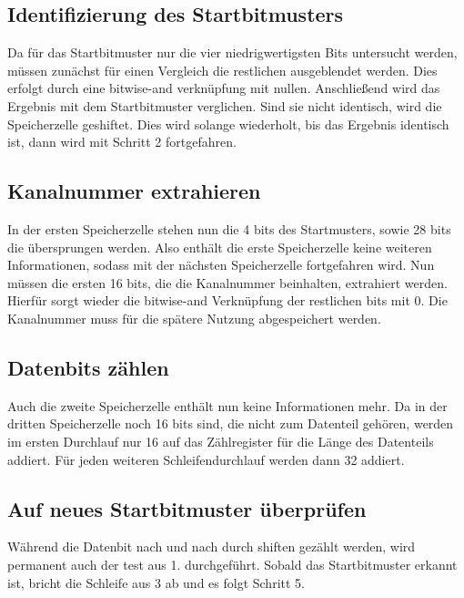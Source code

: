 \documentclass[12pt,titlepage,german,a4]{article}
\begin{document}
    \subsection{Identifizierung des Startbitmusters}
    Da f{\"u}r das Startbitmuster nur die vier niedrigwertigsten Bits untersucht werden, m{\"u}ssen zun{\"a}chst f{\"u}r einen Vergleich die restlichen ausgeblendet werden. Dies erfolgt durch eine bitwise-and verkn{\"u}pfung mit nullen. Anschließend wird das Ergebnis mit dem Startbitmuster verglichen. Sind sie nicht identisch, wird die Speicherzelle geshiftet. Dies wird solange wiederholt, bis das Ergebnis identisch ist, dann wird mit Schritt 2 fortgefahren.

    \subsection{Kanalnummer extrahieren}
    In der ersten Speicherzelle stehen nun die 4 bits des Startmusters, sowie 28 bits die {\"u}bersprungen werden. Also enth{\"a}lt die erste Speicherzelle keine weiteren Informationen, sodass mit der n{\"a}chsten Speicherzelle fortgefahren wird. Nun m{\"u}ssen die ersten 16 bits, die die Kanalnummer beinhalten, extrahiert werden. Hierf{\"u}r sorgt wieder die bitwise-and Verkn{\"u}pfung der restlichen bits mit 0. Die Kanalnummer muss f{\"u}r die sp{\"a}tere Nutzung abgespeichert werden.

    \subsection{Datenbits z{\"a}hlen}
    Auch die zweite Speicherzelle enth{\"a}lt nun keine Informationen mehr. Da in der dritten Speicherzelle noch 16 bits sind, die nicht zum Datenteil geh{\"o}ren, werden im ersten Durchlauf nur 16 auf das Z{\"a}hlregister f{\"u}r die L{\"a}nge des Datenteils addiert. F{\"u}r jeden weiteren Schleifendurchlauf werden dann 32 addiert.

    \subsection{Auf neues Startbitmuster {\"u}berpr{\"u}fen}
    W{\"a}hrend die Datenbit nach und nach durch shiften gez{\"a}hlt werden, wird permanent auch der test aus 1. durchgef{\"u}hrt. Sobald das Startbitmuster erkannt ist, bricht die Schleife aus 3 ab und es folgt Schritt 5.
\end{document}
